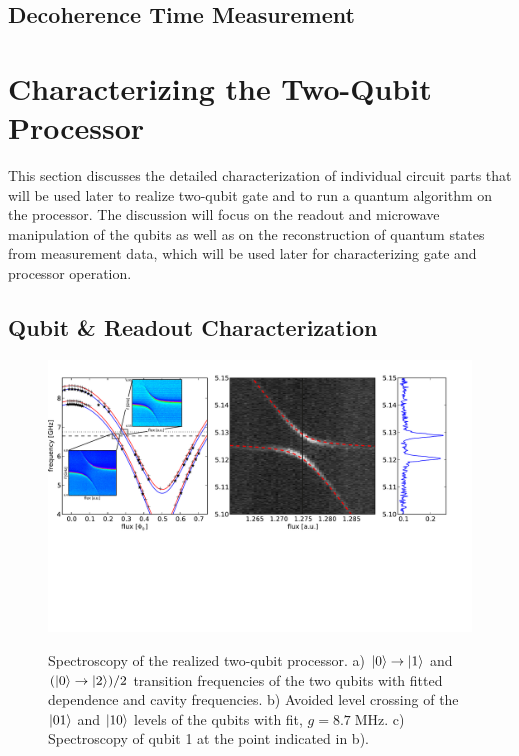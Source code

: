 \section{Decoherence Time Measurement}

\chapter{Characterizing the Two-Qubit Processor}

This section discusses the detailed characterization of individual circuit parts that will be used later to realize two-qubit gate and to run a quantum algorithm on the processor. The discussion will focus on the readout and microwave manipulation of the qubits as well as  on the reconstruction of quantum states from measurement data, which will be used later for characterizing gate and processor operation.

\section{Qubit \& Readout Characterization}

\begin{figure}
	\centering
		\includegraphics[width=1.\textwidth]{"./data/ct5/2011_04_11 - anticrossing/processor_spectroscopy"}
	\label{fig:ProcessorSpectroscopy}
	\caption[Spectroscopy of the Two-Qubit Processor]{Spectroscopy of the realized two-qubit processor. a) $\left| 0 \right>\to\left| 1 \right>$ and $(\left| 0 \right>\to\left| 2 \right>)/2$ transition frequencies of the two qubits with fitted dependence and cavity frequencies. b) Avoided level crossing of the $\left| 01 \right>$ and $\left| 10 \right>$ levels of the qubits with fit, $g = 8.7 \; \mathrm{MHz}$. c) Spectroscopy of qubit 1 at the point indicated in b).}
\end{figure}

